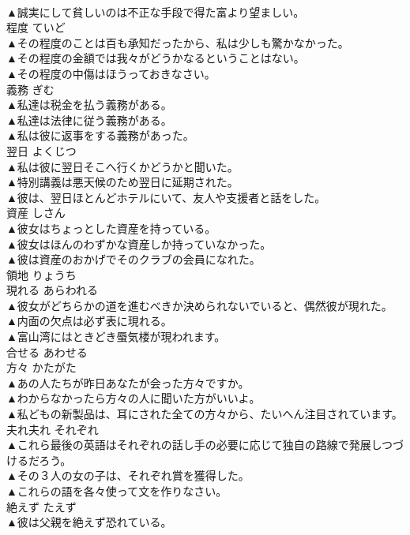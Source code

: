 \documentclass[8pt]{extreport}
\begin{document}
\begin{CJK}{UTF8}{min}
\\	▲誠実にして貧しいのは不正な手段で得た富より望ましい。 
\\	程度	ていど	
\\	▲その程度のことは百も承知だったから、私は少しも驚かなかった。 
\\	▲その程度の金額では我々がどうかなるということはない。 
\\	▲その程度の中傷はほうっておきなさい。 
\\	義務	ぎむ	
\\	▲私達は税金を払う義務がある。 
\\	▲私達は法律に従う義務がある。 
\\	▲私は彼に返事をする義務があった。 
\\	翌日	よくじつ	
\\	▲私は彼に翌日そこへ行くかどうかと聞いた。 
\\	▲特別講義は悪天候のため翌日に延期された。 
\\	▲彼は、翌日ほとんどホテルにいて、友人や支援者と話をした。 
\\	資産	しさん	
\\	▲彼女はちょっとした資産を持っている。 
\\	▲彼女はほんのわずかな資産しか持っていなかった。 
\\	▲彼は資産のおかげでそのクラブの会員になれた。 
\\	領地	りょうち	
\\	現れる	あらわれる	
\\	▲彼女がどちらかの道を進むべきか決められないでいると、偶然彼が現れた。 
\\	▲内面の欠点は必ず表に現れる。 
\\	▲富山湾にはときどき蜃気楼が現われます。 
\\	合せる	あわせる	
\\	方々	かたがた	
\\	▲あの人たちが昨日あなたが会った方々ですか。 
\\	▲わからなかったら方々の人に聞いた方がいいよ。 
\\	▲私どもの新製品は、耳にされた全ての方々から、たいへん注目されています。 
\\	夫れ夫れ	それぞれ	
\\	▲これら最後の英語はそれぞれの話し手の必要に応じて独自の路線で発展しつづけるだろう。 
\\	▲その３人の女の子は、それぞれ賞を獲得した。 
\\	▲これらの語を各々使って文を作りなさい。 
\\	絶えず	たえず	
\\	▲彼は父親を絶えず恐れている。 

\end{CJK}
\end{document}

